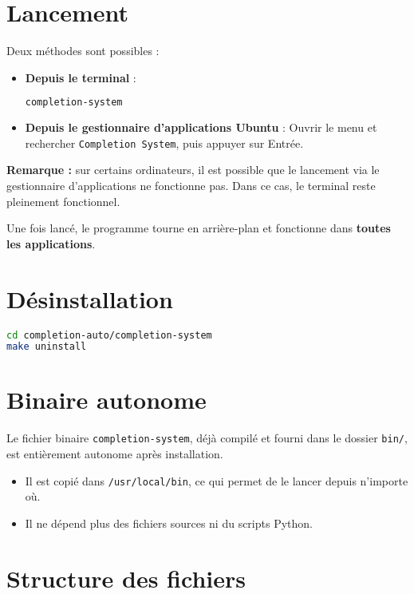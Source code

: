 \section*{Lancement}

Deux méthodes sont possibles :

\begin{itemize}
	\item \textbf{Depuis le terminal} :
	      \begin{lstlisting}[language=bash]
completion-system
  \end{lstlisting}

	\item \textbf{Depuis le gestionnaire d'applications Ubuntu} :
	      Ouvrir le menu et rechercher \texttt{Completion System}, puis appuyer sur Entrée.
\end{itemize}

\textbf{Remarque :} sur certains ordinateurs, il est possible que le lancement via le gestionnaire d’applications ne fonctionne pas. Dans ce cas, le terminal reste pleinement fonctionnel.

Une fois lancé, le programme tourne en arrière-plan et fonctionne dans \textbf{toutes les applications}.

\section*{Désinstallation}

\begin{lstlisting}[language=bash]
cd completion-auto/completion-system
make uninstall
\end{lstlisting}

\section*{Binaire autonome}

Le fichier binaire \texttt{completion-system}, déjà compilé et fourni dans le dossier \texttt{bin/}, est entièrement autonome après installation.

\begin{itemize}
	\item Il est copié dans \texttt{/usr/local/bin}, ce qui permet de le lancer depuis n'importe où.
	\item Il ne dépend plus des fichiers sources ni du scripts Python.
\end{itemize}

\section*{Structure des fichiers}

